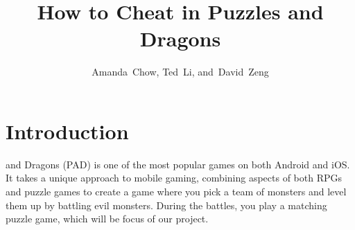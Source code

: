 \documentclass[journal,final,letterpaper,11pt]{IEEEtran}
\begin{document}
\title{How to Cheat in Puzzles and Dragons}
\author{Amanda~Chow, Ted~Li, and~David~Zeng}
\maketitle

\section{Introduction}
 and Dragons (PAD) is one of the most popular games on both  Android and iOS. It takes a unique approach to mobile gaming, combining aspects of both RPGs and puzzle games to create a game where you pick a team of monsters and level them up by battling evil monsters. During the battles, you play a matching puzzle game, which will be focus of our project.
\vspace*{-0.15in}
\end{document}
